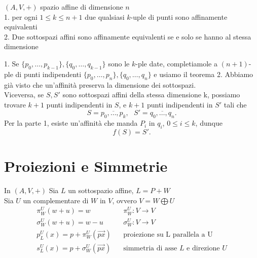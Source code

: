 \documentclass[12px]{article}
\begin{document}
\begin{coro}
	$(A,V,+)$ spazio affine di dimensione $n$\\
	1. per ogni $1\leq k\leq n + 1$ due qualsiasi $k$-uple di punti sono affinamente equivalenti\\
	2. Due sottospazi affini sono affinamente equivalenti se e solo se hanno al stessa dimensione
\end{coro}
\begin{dimo}
	1. Se $\{p_0,\ldots,p_{k-1}\}, \{q_0,\ldots,q_{k - 1}\}$ sono le $k$-ple date, completiamole a $(n+1)$-ple di punti indipendenti $\{p_0,\ldots,p_n\}, \{q_0,\ldots,q_n\}$ e usiamo il teorema
	2. Abbiamo già visto che un'affinità preserva la dimensione dei sottospazi.\\
	Viceversa, se $S,S'$ sono sottospazi affini della stessa dimensione k, possiamo trovare $k+1$ punti indipendenti in $S$, e $k+1$ punti indipendenti in $S'$ tali che \[
	S = \overline{p_0,\ldots,p_k}, \ \ \ S'=\overline{q_0,\ldots,q_n}
	.\] 
	Per la parte 1, esiste un'affinità che manda $P_i$ in $q_i$, $0\leq i \leq k$, dunque \[
	f(S) = S'
	.\]
\end{dimo}
\newpage
\section{Proiezioni e Simmetrie}
\begin{defi}
In $(A,V,+)$ Sia $L$ un sottospazio affine, $L = P+W$\\
Sia $U$ un complementare di $W$ in $V$, ovvero  $V = W\bigoplus U$
\begin{align*}
	\pi_W^U(w+u)=w \ \ \ \ \ \ \ \ \ \ \ & \pi_W^U:V \rightarrow V\\
	\sigma_W^U(w+u) = w - u \ \ \ \ \ & \sigma_W^U:V \rightarrow V \\
	p_L^U(x) = p+\pi_W^U(\overrightarrow{px}) \ \ \ \ &\text{proiezione su L parallela a U}\\
	s_L^U(x) = p+\sigma_W^U(\overrightarrow{px}) \ \ \ \ &\text{simmetria di asse $L$ e direzione $U$}
\end{align*}
\end{defi}
\end{document}
